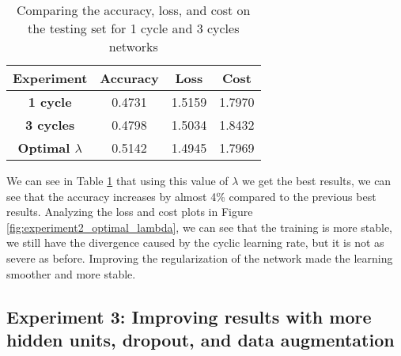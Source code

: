 \documentclass{article}
\begin{document}
\begin{table}[h!]
    \centering
    \begin{tabular}{|c|c|c|c|}
    \hline
    \textbf{Experiment} & \textbf{Accuracy} & \textbf{Loss} & \textbf{Cost} \\
    \hline
    \textbf{1 cycle} & 0.4731 & 1.5159 & 1.7970 \\
    \textbf{3 cycles} & 0.4798 & 1.5034 & 1.8432 \\
    \textbf{Optimal $\lambda$} & 0.5142 & 1.4945 & 1.7969 \\
    \hline
    \end{tabular}
    \caption{Comparing the accuracy, loss, and cost on the testing set for 1 cycle and 3 cycles networks}
    \label{tab:experiment2_optimal_lambda}
\end{table}

We can see in Table \ref{tab:experiment2_optimal_lambda} that using this value of $\lambda$ we get the best results, we can see that the accuracy increases by almost 4\% compared to the previous best results. Analyzing the loss and cost plots in Figure \ref{fig:experiment2_optimal_lambda}, we can see that the training is more stable, we still have the divergence caused by the cyclic learning rate, but it is not as severe as before. Improving the regularization of the network made the learning smoother and more stable.

\newpage

\subsection{Experiment 3: Improving results with more hidden units, dropout, and data augmentation}




\end{document}
